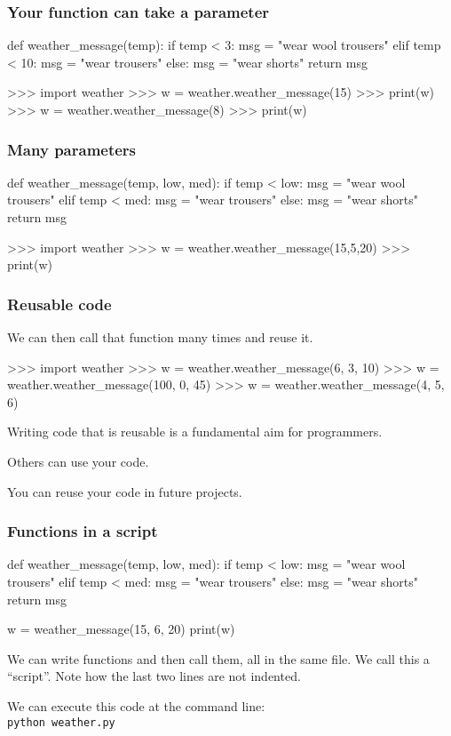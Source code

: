 \documentclass{beamer}
\begin{document}
\begin{frame}[fragile]
\frametitle{Your function can take a parameter}
\begin{shaded}
\begin{code}
def weather_message(temp):
  if temp < 3:
      msg = "wear wool trousers"
   elif temp < 10:
      msg = "wear trousers"
   else: 
      msg = "wear shorts"
   return msg
\end{code}
\end{shaded}
\begin{code}
>>> import weather
>>> w = weather.weather_message(15)
>>> print(w)
>>> w = weather.weather_message(8)
>>> print(w)
\end{code}
\end{frame}

\begin{frame}[fragile]
\frametitle{Many parameters}
\begin{shaded}
\begin{code}
def weather_message(temp, low, med):
  if temp < low:
      msg = "wear wool trousers"
   elif temp < med:
      msg = "wear trousers"
   else: 
      msg = "wear shorts"
   return msg
\end{code}
\end{shaded}
\begin{code}
>>> import weather
>>> w = weather.weather_message(15,5,20)
>>> print(w)
\end{code}
\end{frame}

\begin{frame}[fragile]
\frametitle{Reusable code}
We can then call that function many times and reuse it.
\begin{code}
>>> import weather
>>> w = weather.weather_message(6, 3, 10)
>>> w = weather.weather_message(100, 0, 45)
>>> w = weather.weather_message(4, 5, 6)
\end{code}
Writing code that is reusable is a fundamental aim for
programmers.

\bigskip

Others can use your code.

\bigskip

You can reuse your code in future projects.
\end{frame}

\begin{frame}[fragile]
\frametitle{Functions in a script}
\begin{shaded}
\begin{code}
def weather_message(temp, low, med):
   if temp < low:
      msg = "wear wool trousers"
   elif temp < med:
      msg = "wear trousers"
   else:
      msg = "wear shorts"
   return msg

w = weather_message(15, 6, 20)
print(w)
\end{code}
\end{shaded}
We can write functions and then call them, all in the
same file. We call this a ``script''. Note how the last two lines are
not indented.

\bigskip

We can execute this code at the command line:\\
\texttt{python weather.py}
\end{frame}
\end{document}
